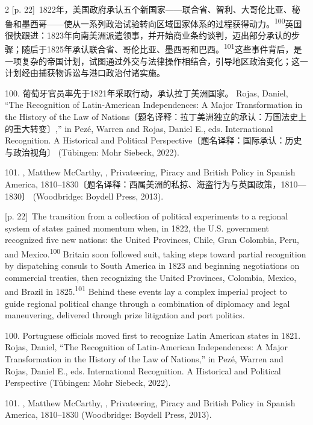 \documentclass[10pt,a4paper]{article}
\begin{document}
\begin{paracol}{2}
{\scriptsize\color{gray} [p. 22]}\ 1822年，美国政府承认五个新国家——联合省、智利、大哥伦比亚、秘鲁和墨西哥——使从一系列政治试验转向区域国家体系的过程获得动\mbox{力。\textsuperscript{100}}英国很快跟进：1823年向南美洲派遣领事，并开始商业条约谈判，迈出部分承认的步骤；随后于1825年承认联合省、哥伦比亚、墨西哥和巴\mbox{西。\textsuperscript{101}}这些事件背后，是一项复杂的帝国计划，试图通过外交与法律操作相结合，引导地区政治变化；这一计划经由捕获物诉讼与港口政治付诸实施。\par{\small 100. 葡萄牙官员率先于1821年采取行动，承认拉丁美洲国家。 Rojas, Daniel, “The Recognition of Latin-American Independences: A Major Transformation in the History of the Law of Nations〔题名译释：拉丁美洲独立的承认：万国法史上的重大转变〕,” in Pezé, Warren and Rojas, Daniel E., eds. International Recognition. A Historical and Political Perspective〔题名译释：国际承认：历史与政治视角〕 (Tübingen: Mohr Siebeck, 2022).\par}{\small 101. , Matthew McCarthy, , Privateering, Piracy and British Policy in Spanish America, 1810–1830〔题名译释：西属美洲的私掠、海盗行为与英国政策，1810—1830〕 (Woodbridge: Boydell Press, 2013).\par}
\switchcolumn
{\scriptsize\color{gray} [p. 22]}\ The transition from a collection of political experiments to a regional system of states gained momentum when, in 1822, the U.S. government recognized five new nations: the United Provinces, Chile, Gran Colombia, Peru, and Mexico.\nobreak\textsuperscript{100} Britain soon followed suit, taking steps toward partial recognition by dispatching consuls to South America in 1823 and beginning negotiations on commercial treaties, then recognizing the United Provinces, Colombia, Mexico, and Brazil in 1825.\nobreak\textsuperscript{101} Behind these events lay a complex imperial project to guide regional political change through a combination of diplomacy and legal maneuvering, delivered through prize litigation and port politics.\par{\small 100. Portuguese officials moved first to recognize Latin American states in 1821. Rojas, Daniel, “The Recognition of Latin-American Independences: A Major Transformation in the History of the Law of Nations,” in Pezé, Warren and Rojas, Daniel E., eds. International Recognition. A Historical and Political Perspective (Tübingen: Mohr Siebeck, 2022).\par}{\small 101. , Matthew McCarthy, , Privateering, Piracy and British Policy in Spanish America, 1810–1830 (Woodbridge: Boydell Press, 2013).\par}

\end{paracol}
\end{document}

